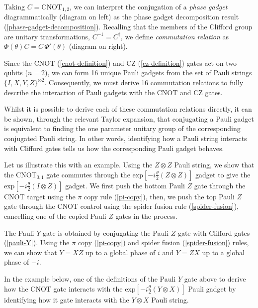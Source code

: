 Taking $C = \text{CNOT}_{1, 2}$, we can interpret the conjugation of a \textit{phase gadget} diagrammatically (diagram on left) as the phase gadget decomposition result (\ref{phase-gadget-decomposition}). Recalling that the members of the Clifford group are unitary transformations, $C^{-1} = C^\dagger$, we define \textit{commutation relation} as $\Phi(\theta) C = C \, \Phi'(\theta)$ (diagram on right).


Since the CNOT (\ref{cnot-definition}) and CZ (\ref{cz-definition}) gates act on two qubits ($n=2$), we can form 16 unique Pauli gadgets from the set of Pauli strings $\{I, X, Y, Z\}^{\otimes 2}$. Consequently, we must derive 16 commutation relations to fully describe the interaction of Pauli gadgets with the CNOT and CZ gates.

Whilst it is possible to derive each of these commutation relations directly, it can be shown, through the relevant Taylor expansion, that conjugating a Pauli gadget is equivalent to finding the one parameter unitary group of the corresponding conjugated Pauli string. In other words, identifying how a Pauli string interacts with Clifford gates tells us how the corresponding Pauli gadget behaves.

Let us illustrate this with an example. Using the $Z \otimes Z$ Pauli string, we show that the $\text{CNOT}_{0, 1}$ gate commutes through the $\text{exp} \left[ - i\frac{\theta}{2} \left( Z \otimes Z \right) \right]$ gadget to give the $\text{exp} \left[ - i\frac{\theta}{2} \left( I \otimes Z \right) \right]$ gadget. We first push the bottom Pauli $Z$ gate through the CNOT target using the $\pi$ copy rule (\ref{pi-copy}), then, we push the top Pauli $Z$ gate through the CNOT control using the spider fusion rule (\ref{spider-fusion}), cancelling one of the copied Pauli $Z$ gates in the process.


The Pauli $Y$ gate is obtained by conjugating the Pauli $Z$ gate with Clifford gates (\ref{pauli-Y}). Using the $\pi$ copy (\ref{pi-copy}) and spider fusion (\ref{spider-fusion}) rules, we can show that $Y=XZ$ up to a global phase of $i$ and $Y=ZX$ up to a global phase of $-i$.


In the example below, one of the definitions of the Pauli $Y$ gate above to derive how the $\text{CNOT}$ gate interacts with the $\text{exp} \left[ - i\frac{\theta}{2} \left(Y \otimes X \right) \right]$ Pauli gadget by identifying how it gate interacts with the $Y \otimes X$ Pauli string.

